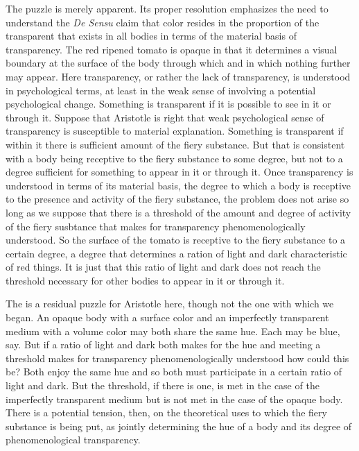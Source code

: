The puzzle is merely apparent. Its proper resolution emphasizes the need to understand the \emph{De Sensu} claim that color resides in the proportion of the transparent that exists in all bodies in terms of the material basis of transparency. The red ripened tomato is opaque in that it determines a visual boundary at the surface of the body through which and in which nothing further may appear. Here transparency, or rather the lack of transparency, is understood in psychological terms, at least in the weak sense of involving a potential psychological change. Something is transparent if it is possible to see in it or through it. Suppose that Aristotle is right that weak psychological sense of transparency is susceptible to material explanation. Something is transparent if within it there is sufficient amount of the fiery substance. But that is consistent with a body being receptive to the fiery substance to some degree, but not to a degree sufficient for something to appear in it or through it. Once transparency is understood in terms of its material basis, the degree to which a body is receptive to the presence and activity of the fiery substance, the problem does not arise so long as we suppose that there is a threshold of the amount and degree of activity of the fiery susbtance that makes for transparency phenomenologically understood. So the surface of the tomato is receptive to the fiery substance to a certain degree, a degree that determines a ration of light and dark characteristic of red things. It is just that this ratio of light and dark does not reach the threshold necessary for other bodies to appear in it or through it.

The is a residual puzzle for Aristotle here, though not the one with which we began. An opaque body with a surface color and an imperfectly transparent medium with a volume color may both share the same hue. Each may be blue, say. But if a ratio of light and dark both makes for the hue and meeting a threshold makes for transparency phenomenologically understood how could this be? Both enjoy the same hue and so both must participate in a certain ratio of light and dark. But the threshold, if there is one, is met in the case of the imperfectly transparent medium but is not met in the case of the opaque body. There is a potential tension, then, on the theoretical uses to which the fiery substance is being put, as jointly determining the hue of a body and its degree of phenomenological transparency.




